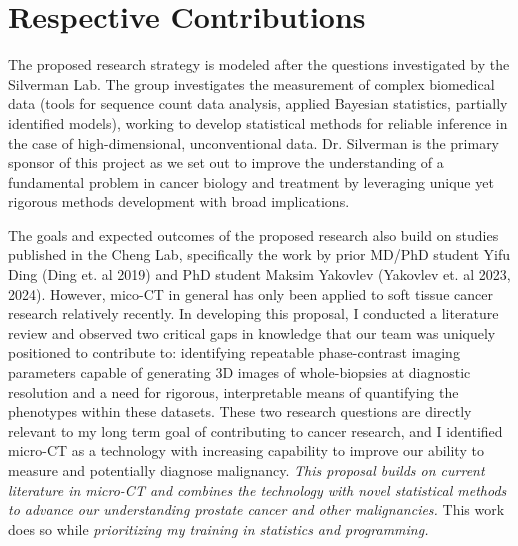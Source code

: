 \documentclass{NIHGrant}
\begin{document}
\part*{Respective Contributions}
The proposed research strategy is modeled after the questions investigated by the Silverman Lab. The group investigates the measurement of complex biomedical data (tools for sequence count data analysis, applied Bayesian statistics, partially identified models), working to develop statistical methods for reliable inference in the case of high-dimensional, unconventional data. Dr. Silverman is the primary sponsor of this project as we set out to improve the understanding of a fundamental problem in cancer biology and treatment by leveraging unique yet rigorous methods development with broad implications.

The goals and expected outcomes of the proposed research also build on studies published in the Cheng Lab, specifically the work by prior MD/PhD student Yifu Ding (Ding et. al 2019) and PhD student Maksim Yakovlev (Yakovlev et. al 2023, 2024). However, mico-CT in general has only been applied to soft tissue cancer research relatively recently. In developing this proposal, I conducted a literature review and observed two critical gaps in knowledge that our team was uniquely positioned to contribute to: identifying repeatable phase-contrast imaging parameters capable of generating 3D images of whole-biopsies at diagnostic resolution and a need for rigorous, interpretable means of quantifying the phenotypes within these datasets. These two research questions are directly relevant to my long term goal of contributing to cancer research, and I identified micro-CT as a technology with increasing capability to improve our ability to measure and potentially diagnose malignancy. \emph{This proposal builds on current literature in micro-CT and combines the technology with novel statistical methods to advance our understanding prostate cancer and other malignancies.} This work does so while \emph{prioritizing my training in statistics and programming.}
\end{document}
